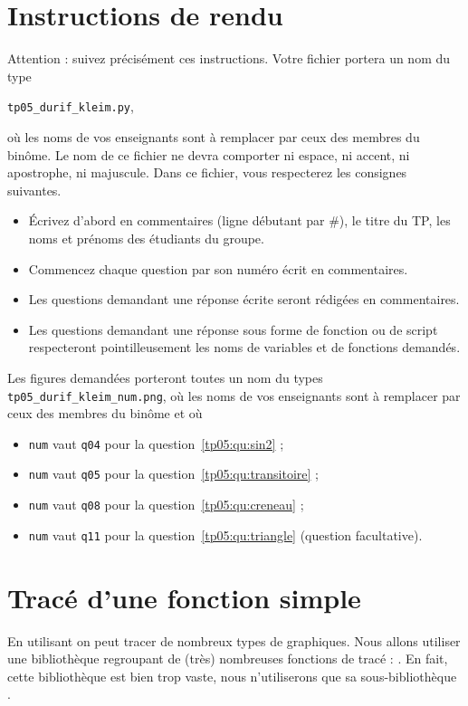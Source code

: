 \section*{Instructions de rendu}
Attention : suivez précisément ces instructions. 
Votre fichier portera un nom du type 
\begin{center}
  \texttt{tp05\_durif\_kleim.py},
\end{center}
 où les noms de vos enseignants sont à remplacer par ceux des membres du binôme. Le nom de ce 
fichier ne devra comporter ni espace, ni accent, ni apostrophe, ni majuscule.
Dans ce fichier, vous respecterez les consignes suivantes.
\begin{itemize}
  \item \'Ecrivez d'abord en commentaires (ligne débutant par \#), le titre du TP, les noms et prénoms des étudiants du groupe.
  \item Commencez chaque question par son numéro écrit en commentaires.
  \item Les questions demandant une réponse écrite seront rédigées en commentaires.
  \item Les questions demandant une réponse sous forme de fonction ou de script respecteront pointilleusement les noms de variables et de fonctions demandés.
\end{itemize}
Les figures demandées porteront toutes un nom du types \texttt{tp05\_durif\_kleim\_num.png}, où les noms de vos enseignants sont à remplacer par ceux des membres du binôme et où
\begin{itemize}
  \item \texttt{num} vaut \texttt{q04} pour la question~\ref{tp05:qu:sin2} ;
  \item \texttt{num} vaut \texttt{q05} pour la question~\ref{tp05:qu:transitoire} ;
  \item \texttt{num} vaut \texttt{q08} pour la question~\ref{tp05:qu:creneau} ;
  \item \texttt{num} vaut \texttt{q11} pour la question~\ref{tp05:qu:triangle} (question facultative).
\end{itemize}

\section{Tracé d'une fonction simple}

En utilisant \python{} on peut tracer de nombreux types de graphiques. 
Nous allons utiliser une bibliothèque regroupant de (très) nombreuses fonctions de tracé : .
En fait, cette bibliothèque est bien trop vaste, nous n'utiliserons que sa sous-bibliothèque .

